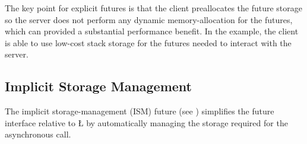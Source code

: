 \documentclass[openright,twoside]{report}
\begin{document}
The key point for explicit futures is that the client preallocates the future storage so the server does not perform any dynamic memory-allocation for the futures, which can provided a substantial performance benefit.
In the example, the client is able to use low-cost stack storage for the futures needed to interact with the server.


\subsection{Implicit Storage Management}
\label{s:FutureISM}

The implicit storage-management (ISM) future (see ) simplifies the future interface relative to \LGinlinetrue\LGbegin\lgrinde\L{}\endlgrinde\LGend{} by automatically managing the storage required for the asynchronous call.
\end{document}
